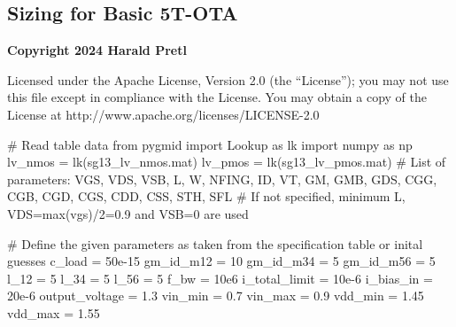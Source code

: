 \documentclass[
  a4paper,
  DIV=11,
  numbers=noendperiod]{scrartcl}
\newenvironment{Shaded}{\begin{snugshade}}{\end{snugshade}}
\newcommand{\CommentTok}[1]{\textcolor[rgb]{0.37,0.37,0.37}{#1}}
\newcommand{\DecValTok}[1]{\textcolor[rgb]{0.68,0.00,0.00}{#1}}
\newcommand{\FloatTok}[1]{\textcolor[rgb]{0.68,0.00,0.00}{#1}}
\newcommand{\ImportTok}[1]{\textcolor[rgb]{0.00,0.46,0.62}{#1}}
\newcommand{\NormalTok}[1]{\textcolor[rgb]{0.00,0.23,0.31}{#1}}
\newcommand{\OperatorTok}[1]{\textcolor[rgb]{0.37,0.37,0.37}{#1}}
\newcommand{\StringTok}[1]{\textcolor[rgb]{0.13,0.47,0.30}{#1}}
\begin{document}
\begin{tcolorbox}[enhanced jigsaw, titlerule=0mm, left=2mm, coltitle=black, toprule=.15mm, breakable, opacitybacktitle=0.6, colframe=quarto-callout-tip-color-frame, bottomtitle=1mm, toptitle=1mm, opacityback=0, colbacktitle=quarto-callout-tip-color!10!white, title=\textcolor{quarto-callout-tip-color}{\faLightbulb}\hspace{0.5em}{Solution: 5T-OTA Sizing}, arc=.35mm, rightrule=.15mm, colback=white, bottomrule=.15mm, leftrule=.75mm]

\section*{Sizing for Basic 5T-OTA}\label{sizing-for-basic-5t-ota}

\textbf{Copyright 2024 Harald Pretl}

Licensed under the Apache License, Version 2.0 (the ``License''); you
may not use this file except in compliance with the License. You may
obtain a copy of the License at
http://www.apache.org/licenses/LICENSE-2.0

\begin{Shaded}
\begin{Highlighting}[]
\CommentTok{\# Read table data}
\ImportTok{from}\NormalTok{ pygmid }\ImportTok{import}\NormalTok{ Lookup }\ImportTok{as}\NormalTok{ lk}
\ImportTok{import}\NormalTok{ numpy }\ImportTok{as}\NormalTok{ np}
\NormalTok{lv\_nmos }\OperatorTok{=}\NormalTok{ lk(}\StringTok{\textquotesingle{}sg13\_lv\_nmos.mat\textquotesingle{}}\NormalTok{)}
\NormalTok{lv\_pmos }\OperatorTok{=}\NormalTok{ lk(}\StringTok{\textquotesingle{}sg13\_lv\_pmos.mat\textquotesingle{}}\NormalTok{)}
\CommentTok{\# List of parameters: VGS, VDS, VSB, L, W, NFING, ID, VT, GM, GMB, GDS, CGG, CGB, CGD, CGS, CDD, CSS, STH, SFL}
\CommentTok{\# If not specified, minimum L, VDS=max(vgs)/2=0.9 and VSB=0 are used }
\end{Highlighting}
\end{Shaded}

\begin{Shaded}
\begin{Highlighting}[]
\CommentTok{\# Define the given parameters as taken from the specification table or inital guesses}
\NormalTok{c\_load }\OperatorTok{=} \FloatTok{50e{-}15}
\NormalTok{gm\_id\_m12 }\OperatorTok{=} \DecValTok{10}
\NormalTok{gm\_id\_m34 }\OperatorTok{=} \DecValTok{5}
\NormalTok{gm\_id\_m56 }\OperatorTok{=} \DecValTok{5}
\NormalTok{l\_12 }\OperatorTok{=} \DecValTok{5}
\NormalTok{l\_34 }\OperatorTok{=} \DecValTok{5}
\NormalTok{l\_56 }\OperatorTok{=} \DecValTok{5}
\NormalTok{f\_bw }\OperatorTok{=} \FloatTok{10e6}
\NormalTok{i\_total\_limit }\OperatorTok{=} \FloatTok{10e{-}6}
\NormalTok{i\_bias\_in }\OperatorTok{=} \FloatTok{20e{-}6}
\NormalTok{output\_voltage }\OperatorTok{=} \FloatTok{1.3}
\NormalTok{vin\_min }\OperatorTok{=} \FloatTok{0.7}
\NormalTok{vin\_max }\OperatorTok{=} \FloatTok{0.9}
\NormalTok{vdd\_min }\OperatorTok{=} \FloatTok{1.45}
\NormalTok{vdd\_max }\OperatorTok{=} \FloatTok{1.55}
\end{Highlighting}
\end{Shaded}


\end{tcolorbox}
\end{document}
